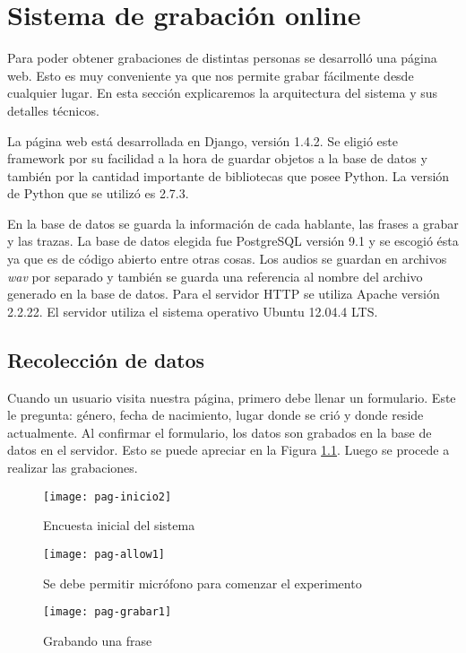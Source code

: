 \chapter{Sistema de grabación online}

Para poder obtener grabaciones de distintas personas se desarrolló una página web. Esto es muy conveniente ya que nos permite grabar fácilmente desde cualquier lugar. En esta sección explicaremos la arquitectura del sistema y sus detalles técnicos.

La página web está desarrollada en Django, versión 1.4.2. Se eligió este framework por su facilidad a la hora de guardar objetos a la base de datos y también por la cantidad importante de bibliotecas que posee Python. La versión de Python que se utilizó es 2.7.3. 

En la base de datos se guarda la información de cada hablante, las frases a grabar y las trazas. La base de datos elegida fue PostgreSQL versión 9.1 y se escogió ésta ya que es de código abierto entre otras cosas. Los audios se guardan en archivos \textit{wav} por separado y también se guarda una referencia al nombre del archivo generado en la base de datos. Para el servidor HTTP se utiliza Apache versión 2.2.22. El servidor utiliza el sistema operativo Ubuntu 12.04.4 LTS.

\section{Recolección de datos}

Cuando un usuario visita nuestra página, primero debe llenar un formulario. Este le pregunta: género, fecha de nacimiento, lugar donde se crió y donde reside actualmente. Al confirmar el formulario, los datos son grabados en la base de datos en el servidor. Esto se puede apreciar en la Figura \ref{figEncuesta}. Luego se procede a realizar las grabaciones. 

\begin{figure}[h!]
    \centerline{\texttt{[image: pag-inicio2]} }
    \caption{Encuesta inicial del sistema}
    \label{figEncuesta}
\end{figure}

\begin{figure}[h!]
    \centerline{\texttt{[image: pag-allow1]} }
    \caption{Se debe permitir micrófono para comenzar el experimento}
    \label{allowmic}
\end{figure}

\begin{figure}[h!]
    \centerline{\texttt{[image: pag-grabar1]} }
    \caption{Grabando una frase}
    \label{grabando}
\end{figure}

